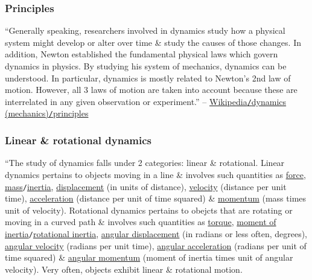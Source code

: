 \documentclass{article}
\begin{document}
\subsubsection{Principles}
``Generally speaking, researchers involved in dynamics study how a physical system might develop or alter over time \& study the causes of those changes. In addition, Newton established the fundamental physical laws which govern dynamics in physics. By studying his system of mechanics, dynamics can be understood. In particular, dynamics is mostly related to Newton's 2nd law of motion. However, all 3 laws of motion are taken into account because these are interrelated in any given observation or experiment.'' -- \href{https://en.wikipedia.org/wiki/Dynamics_(mechanics)#Principles}{Wikipedia{\tt/}dynamics (mechanics){\tt/}principles}

\subsubsection{Linear \& rotational dynamics}
``The study of dynamics falls under 2 categories: linear \& rotational. Linear dynamics pertains to objects moving in a line \& involves such quantities as \href{https://en.wikipedia.org/wiki/Force}{force}, \href{https://en.wikipedia.org/wiki/Mass}{mass}{\tt/}\href{https://en.wikipedia.org/wiki/Inertia#Mass_and_inertia}{inertia}, \href{https://en.wikipedia.org/wiki/Displacement_(vector)}{displacement} (in units of distance), \href{https://en.wikipedia.org/wiki/Velocity}{velocity} (distance per unit time), \href{https://en.wikipedia.org/wiki/Acceleration}{acceleration} (distance per unit of time squared) \& \href{https://en.wikipedia.org/wiki/Momentum}{momentum} (mass times unit of velocity). Rotational dynamics pertains to obejcts that are rotating or moving in a curved path \& involves such quantities as \href{https://en.wikipedia.org/wiki/Torque}{torque}, \href{https://en.wikipedia.org/wiki/Moment_of_inertia}{moment of inertia}{\tt/}\href{https://en.wikipedia.org/wiki/Rotational_inertia}{rotational inertia}, \href{https://en.wikipedia.org/wiki/Angular_displacement}{angular displacement} (in radians or less often, degrees), \href{https://en.wikipedia.org/wiki/Angular_velocity}{angular velocity} (radians per unit time), \href{https://en.wikipedia.org/wiki/Angular_acceleration}{angular acceleration} (radians per unit of time squared) \& \href{https://en.wikipedia.org/wiki/Angular_momentum}{angular momentum} (moment of inertia times unit of angular velocity). Very often, objects exhibit linear \& rotational motion.
\end{document}
